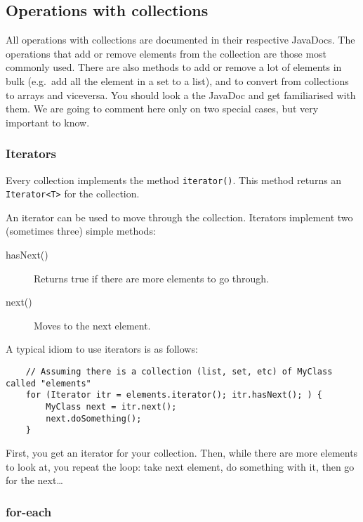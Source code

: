 \subsection{Operations with collections}
\label{sec:oper-with-coll}

All operations with collections are documented in their respective
JavaDocs. The operations that add or remove
elements from the collection are those most commonly used. 
There are also methods to add or remove
a lot of elements in bulk (e.g.~add all the element in a set to a list),
and to convert from collections to arrays and viceversa. You should
look a the JavaDoc and get familiarised with them.  We are going
to comment here only on two special cases, but very important to know. 

\subsubsection{Iterators}
\label{sec:iterators}

Every collection implements the method \verb+iterator()+. This method
returns an \verb+Iterator<T>+ for the collection. 

An iterator can be used to move through the collection. Iterators
implement two (sometimes three) simple methods: 

\begin{description}
\item[hasNext()] Returns true if there are more elements to go
  through.
\item[next()] Moves to the next element.
\end{description}

A typical idiom to use iterators is as follows: 

\begin{verbatim}
    // Assuming there is a collection (list, set, etc) of MyClass called "elements"
    for (Iterator itr = elements.iterator(); itr.hasNext(); ) {
        MyClass next = itr.next();
        next.doSomething();
    }
\end{verbatim}

First, you get an iterator for your collection. Then,
while there are more elements to look at,
you repeat the loop: take next element, do something with it, then go
for the next\ldots

\subsubsection{for-each}
\label{sec:each}

